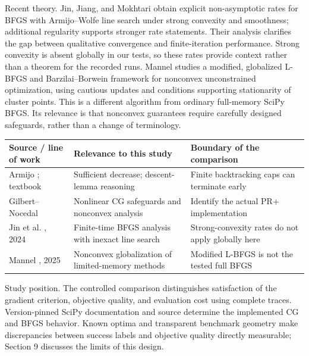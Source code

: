 \documentclass[10pt]{article}
\begin{document}
Recent theory. Jin, Jiang, and Mokhtari \cite{ref5} obtain explicit non-asymptotic rates for BFGS with Armijo--Wolfe line search under strong convexity and smoothness; additional regularity supports stronger rate statements. Their analysis clarifies the gap between qualitative convergence and finite-iteration performance. Strong convexity is absent globally in our tests, so these rates provide context rather than a theorem for the recorded runs. Mannel \cite{ref6} studies a modified, globalized L-BFGS and Barzilai--Borwein framework for nonconvex unconstrained optimization, using cautious updates and conditions supporting stationarity of cluster points. This is a different algorithm from ordinary full-memory SciPy BFGS. Its relevance is that nonconvex guarantees require carefully designed safeguards, rather than a change of terminology.

\begingroup
\fontsize{8}{9.2}\selectfont
\setlength{\tabcolsep}{3pt}
\renewcommand{\arraystretch}{1.05}
\centering
\begin{tabular}{@{}>{\raggedright\arraybackslash}p{}>{\raggedright\arraybackslash}p{}>{\raggedright\arraybackslash}p{}@{}}
\toprule
\textbf{Source / line of work} & \textbf{Relevance to this study} & \textbf{Boundary of the comparison} \\
\midrule
Armijo \cite{ref2}; textbook \cite{ref1} & Sufficient decrease; descent-lemma reasoning & Finite backtracking caps can terminate early \\
Gilbert--Nocedal \cite{ref3} & Nonlinear CG safeguards and nonconvex analysis & Identify the actual PR+ implementation \\
Jin et al. \cite{ref5}, 2024 & Finite-time BFGS analysis with inexact line search & Strong-convexity rates do not apply globally here \\
Mannel \cite{ref6}, 2025 & Nonconvex globalization of limited-memory methods & Modified L-BFGS is not the tested full BFGS \\
\bottomrule
\end{tabular}\par
\endgroup
\smallskip
Study position. The controlled comparison distinguishes satisfaction of the gradient criterion, objective quality, and evaluation cost using complete traces. Version-pinned SciPy documentation and source \cite{ref7} determine the implemented CG and BFGS behavior. Known optima and transparent benchmark geometry make discrepancies between success labels and objective quality directly measurable; Section 9 discusses the limits of this design.
\end{document}
